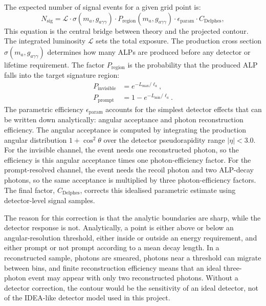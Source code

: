 \documentclass[12pt,a4paper]{article}
\newcommand{\alp}{a}
\newcommand{\gagg}{g_{a\gamma\gamma}}
\newcommand{\ma}{m_a}
\newcommand{\Lint}{\mathcal{L}}
\begin{document}
The expected number of signal events for a given grid point is:
\begin{equation}
    N_\mathrm{sig} = \Lint \cdot
    \sigma(\ma, \gagg) \cdot
    P_\mathrm{region}(\ma, \gagg) \cdot
    \epsilon_\mathrm{param} \cdot
    C_\mathrm{Delphes},
    \label{eq:nsig}
\end{equation}
This equation is the central bridge between theory and the projected contour.
The integrated luminosity $\Lint$ sets the total exposure. The production cross
section $\sigma(\ma,\gagg)$ determines how many ALPs are produced before any
detector or lifetime requirement. The factor $P_\mathrm{region}$ is the
probability that the produced ALP falls into the target signature region:
\begin{align}
    P_\mathrm{invisible} &= e^{-L_\mathrm{max}/\ell_\alp},
    \label{eq:pinv}\\
    P_\mathrm{prompt} &= 1 - e^{-L_\mathrm{min}/\ell_\alp}.
    \label{eq:pprompt}
\end{align}
The parametric efficiency $\epsilon_\mathrm{param}$ accounts for the simplest
detector effects that can be written down analytically: angular acceptance and
photon reconstruction efficiency. The angular acceptance is computed by
integrating the production angular distribution
$1+\cos^2\theta$ over the detector pseudorapidity range $|\eta|<3.0$. For the
invisible channel, the event needs one reconstructed photon, so the efficiency
is this angular acceptance times one photon-efficiency factor. For the
prompt-resolved channel, the event needs the recoil photon and two ALP-decay
photons, so the same acceptance is multiplied by three photon-efficiency
factors. The final factor, $C_\mathrm{Delphes}$, corrects this idealised
parametric estimate using detector-level signal samples.

The reason for this correction is that the analytic boundaries are sharp, while
the detector response is not. Analytically, a point is either above or below an
angular-resolution threshold, either inside or outside an energy requirement,
and either prompt or not prompt according to a mean decay length. In a
reconstructed sample, photons are smeared, photons near a threshold can migrate
between bins, and finite reconstruction efficiency means that an ideal
three-photon event may appear with only two reconstructed photons. Without a
detector correction, the contour would be the sensitivity of an ideal detector,
not of the IDEA-like detector model used in this project.
\end{document}
